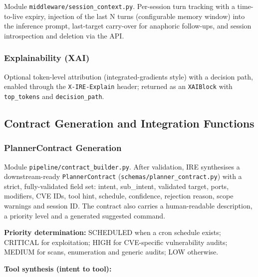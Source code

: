 \documentclass[10pt,journal,onecolumn]{IEEEtran}
\begin{document}
Module \texttt{middleware/\allowbreak session\_\allowbreak context.\allowbreak py}. Per-session turn tracking with a time-to-live expiry, injection of the last N turns (configurable memory window) into the inference prompt, last-target carry-over for anaphoric follow-ups, and session introspection and deletion via the API.

\subsubsection{Explainability (XAI)}

Optional token-level attribution (integrated-gradients style) with a decision path, enabled through the \texttt{X-IRE-Explain} header; returned as an \texttt{XAIBlock} with \texttt{top\_tokens} and \texttt{decision\_path}.

\subsection{Contract Generation and Integration Functions}

\subsubsection{PlannerContract Generation}

Module \texttt{pipeline/\allowbreak contract\_\allowbreak builder.\allowbreak py}. After validation, IRE synthesises a downstream-ready \texttt{PlannerContract} (\texttt{schemas/\allowbreak planner\_\allowbreak contract.\allowbreak py}) with a strict, fully-validated field set: intent, sub\_intent, validated target, ports, modifiers, CVE IDs, tool hint, schedule, confidence, rejection reason, scope warnings and session ID. The contract also carries a human-readable description, a priority level and a generated suggested command.

\textbf{Priority determination:} SCHEDULED when a cron schedule exists; CRITICAL for exploitation; HIGH for CVE-specific vulnerability audits; MEDIUM for scans, enumeration and generic audits; LOW otherwise.

\textbf{Tool synthesis (intent to tool):}
\end{document}
